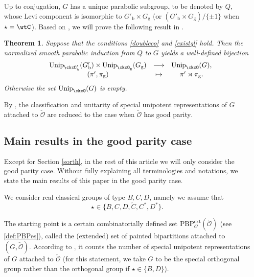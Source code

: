 \documentclass[11pt,a4paper]{amsart}
\newcommand{\CO}{{\mathcal {O}}}
\numberwithin{equation}{section}
\newtheorem{thm}{Theorem}[section]
\theoremstyle{remark}
\def\Unip{\mathrm{Unip}}
\def\PBPeg{\mathrm{PBP}^{\mathrm{ext}}_{G}}
\begin{document}
Up to conjugation, $G$ has a unique parabolic subgroup, to be denoted by $Q$, whose Levi component is
isomorphic to   $G'_\mathrm b\times G_\mathrm g$ (or   $(G'_\mathrm b\times G_\mathrm g)/\{\pm 1\} $ when $\star=\wtC$). Based on \cite[Theorems 2.17 and 2.21]{BMSZa}, we will prove the following result in .
\begin{thm} %
\label{thmB}
 Suppose that the conditions  \eqref{doubleco} and \eqref{existgl} hold. Then the normalized smooth parabolic induction from $Q$ to $G$ yields
   a well-defined bijection
   \[
    \begin{array}{rccc}
 &\Unip_{\ckcO'_{\mathrm b}}( G'_{\mathrm b}) \times   \Unip_{\ckcO_{\mathrm g}}( G_{\mathrm g})  &         \longrightarrow &\Unip_{\ckcO }(G), \\
                &   (\pi',\pi_\mathrm g) & \mapsto & \pi'\rtimes \pi_\mathrm g.
    \end{array}
 \]
 Otherwise the set $\Unip_{\ckcO }(G)$ is empty.
\end{thm}


By , the classification and unitarity  of special unipotent representations of $G$ attached to $\check \CO$ are reduced to the case when $\check \CO$ has good parity.

\subsection{Main results in the good parity case}\label{subsec:goodPR}


Except for Section \ref{sorth}, in the rest of this article we will only consider the good parity case. Without fully explaining all terminologies and notations, we state the main results of this paper in the good parity case.

We consider real classical groups of type $B,C,D$, namely we  assume that \[\star\in \{B,C,D,\widetilde {C}, C^*, D^*\}.\]

The starting point is a certain combinatorially defined set $\PBPeg(\check \CO)$ (see \eqref{def:PBPes}), called the (extended) set of painted bipartitions attached to $(G, \check \CO)$. According to \cite{BMSZa}, it counts the number of special unipotent representations of $G$ attached to $\check \CO$ (for this statement, we take $G$ to be the special orthogonal group rather than the orthogonal group if $\star\in \{B,D\}$).
\end{document}
